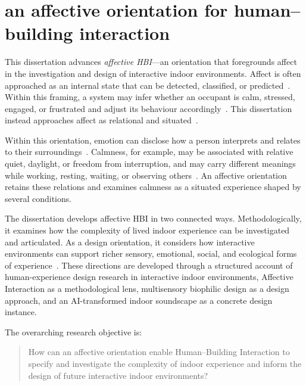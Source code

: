 \section{an affective orientation for human--building interaction}
This dissertation advances \emph{affective HBI}---an orientation that foregrounds affect in the investigation and design of interactive indoor environments. Affect is often approached as an internal state that can be detected, classified, or predicted~\cite{russell1980circumplex, picard1999affective}. Within this framing, a system may infer whether an occupant is calm, stressed, engaged, or frustrated and adjust its behaviour accordingly~\cite{gao2022understanding}. This dissertation instead approaches affect as relational and situated~\cite{boehner2007emotion, lottridge2011affective, barrett2022context}.

Within this orientation, emotion can disclose how a person interprets and relates to their surroundings~\cite{boehner2007emotion, rao2026emotion}. Calmness, for example, may be associated with relative quiet, daylight, or freedom from interruption, and may carry different meanings while working, resting, waiting, or observing others~\cite{rao2026emotion}. An affective orientation retains these relations and examines calmness as a situated experience shaped by several conditions.

The dissertation develops affective HBI in two connected ways. Methodologically, it examines how the complexity of lived indoor experience can be investigated and articulated. As a design orientation, it considers how interactive environments can support richer sensory, emotional, social, and ecological forms of experience~\cite{rao2025lessons, rao2025designing}. These directions are developed through a structured account of human-experience design research in interactive indoor environments, Affective Interaction as a methodological lens, multisensory biophilic design as a design approach, and an AI-transformed indoor soundscape as a concrete design instance.

The overarching research objective is:
\begin{quote}
How can an affective orientation enable Human--Building Interaction to specify and investigate the complexity of indoor experience and inform the design of future interactive indoor environments?
\end{quote}

